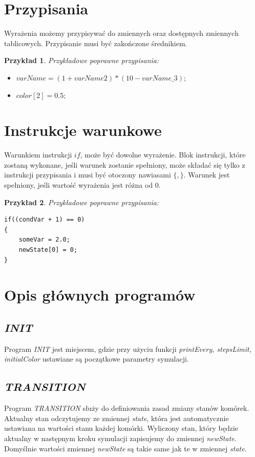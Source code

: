 \documentclass[declaration,shortabstract, inz]{iithesis}
\theoremstyle{definition} \newtheorem{definition}{Definicja}[]
\theoremstyle{plain} \newtheorem{remark}[definition]{Obserwacja}
\theoremstyle{plain} \newtheorem{theorem}[definition]{Twierdzenie}
\theoremstyle{plain} \newtheorem{example}{Przykład}[definition]
\theoremstyle{plain} \newtheorem{lemma}[definition]{Lemat}
\begin{document}
\section{Przypisania}
Wyrażenia możemy przypisywać do zmiennych oraz dostępnych zmiennych tablicowych. Przypisanie musi być zakończone średnikiem.

\begin{example}
Przykładowe poprawne przypisania:
\begin{itemize}
\item $varName = (1 + varName2) * (10 - varName\_3);$
\item $color[2] = 0.5;$
\end{itemize}
\end{example}

\section{Instrukcje warunkowe}
Warunkiem instrukcji $if$, może być dowolne wyrażenie. Blok instrukcji, które zostaną wykonane, jeśli warunek zostanie spełniony, może składać się tylko z instrukcji przypisania i musi być otoczony nawiasami $\{, \}$. Warunek jest spełniony, jeśli wartość wyrażenia jest różna od $0$.

\begin{example}
Przykładowe poprawne przypisania:
\begin{center}
\begin{lstlisting}
if((condVar + 1) == 0)
{
	someVar = 2.0;
	newState[0] = 0;
}
\end{lstlisting}
\end{center}
\end{example}

\section{Opis głównych programów}

\subsection{\textit{INIT}}
Program \textit{INIT} jest miejscem, gdzie przy użyciu funkcji \textit{printEvery, stepsLimit, initialColor} ustawiane są początkowe parametry symulacji.

\subsection{\textit{TRANSITION}}
Program \textit{TRANSITION} służy do definiowania zasad zmiany stanów komórek. Aktualny stan odczytujemy ze zmiennej \textit{state}, która jest automatycznie ustawiana na wartości stanu każdej komórki. Wyliczony stan, który będzie aktualny w następnym kroku symulacji zapisujemy do zmiennej \textit{newState}. Domyślnie wartości zmiennej \textit{newState} są takie same jak te w zmiennej \textit{state}.
\end{document}

